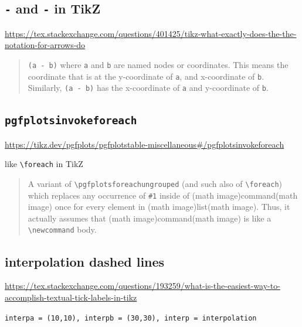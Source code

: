 \documentclass[
]{book}
\theoremstyle{definition}
\theoremstyle{definition}
\theoremstyle{definition}
\theoremstyle{definition}
\theoremstyle{remark}
\begin{document}
\hypertarget{and---in-tikz}{%
\subsection{\texorpdfstring{\texttt{\textbar{}-} and \texttt{-\textbar{}} in TikZ}{\textbar- and -\textbar{} in TikZ}}\label{and---in-tikz}}

\url{https://tex.stackexchange.com/questions/401425/tikz-what-exactly-does-the-the-notation-for-arrows-do}

\begin{quote}
\texttt{(a\ -\textbar{}\ b)} where \texttt{a} and \texttt{b} are named nodes or coordinates. This means the coordinate that is at the y-coordinate of \texttt{a}, and x-coordinate of \texttt{b}. Similarly, \texttt{(a\ \textbar{}-\ b)} has the x-coordinate of \texttt{a} and y-coordinate of \texttt{b}.
\end{quote}

\hypertarget{pgfplotsinvokeforeach}{%
\subsection{\texorpdfstring{\texttt{pgfplotsinvokeforeach}}{pgfplotsinvokeforeach}}\label{pgfplotsinvokeforeach}}

\url{https://tikz.dev/pgfplots/pgfplotstable-miscellaneous\#/pgfplotsinvokeforeach}

like \texttt{\textbackslash{}foreach} in TikZ

\begin{quote}
A variant of \texttt{\textbackslash{}pgfplotsforeachungrouped} (and such also of \texttt{\textbackslash{}foreach}) which replaces any occurrence of \texttt{\#1} inside of (math image)command(math image) once for every element in (math image)list(math image). Thus, it actually assumes that (math image)command(math image) is like a \texttt{\textbackslash{}newcommand} body.
\end{quote}

\hypertarget{interpolation-dashed-lines}{%
\subsection{interpolation dashed lines}\label{interpolation-dashed-lines}}

\url{https://tex.stackexchange.com/questions/193259/what-is-the-easiest-way-to-accomplish-textual-tick-labels-in-tikz}

\texttt{interpa\ =\ (10,10),\ interpb\ =\ (30,30),\ interp\ =\ interpolation}
\end{document}
